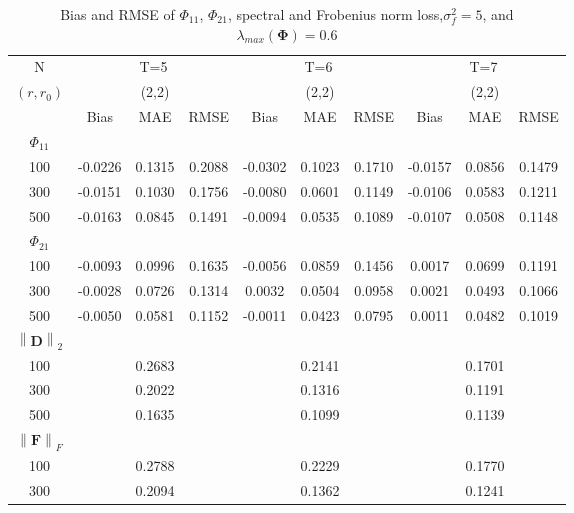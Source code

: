 \documentclass[12pt,a4paper,hyperref]{article}
\begin{document}
\begin{table}[H]
\caption{Bias and RMSE of $\Phi_{11}$, $\Phi_{21}$, spectral and Frobenius norm loss,$\sigma^{2}_{f}=5$,  and $\lambda_{max}(\boldsymbol{\Phi})=0.6$}
\centering
\tabcolsep=0.11cm
\begin{threeparttable}
\begin{tabular} {*{10}{c}}
\toprule
N& \multicolumn{3}{c}{T=5}&\multicolumn{3}{c}{T=6}&\multicolumn{3}{c}{T=7}\\
\cmidrule(lr){1-10}
$(r,r_{0})$ &   &(2,2)  &  &   &(2,2)  & &  &(2,2) & \\
\cmidrule(lr){1-4} \cmidrule(lr){5-7}\cmidrule(lr){8-10}
& \multicolumn{1}{c}{Bias} &\multicolumn{1}{c}{MAE}& \multicolumn{1}{c}{RMSE}&\multicolumn{1}{c}{Bias} &\multicolumn{1}{c}{MAE}& \multicolumn{1}{c}{RMSE}&\multicolumn{1}{c}{Bias}&\multicolumn{1}{c}{MAE} & \multicolumn{1}{c}{RMSE}\\
  \cmidrule(lr){2-4} \cmidrule(lr){5-7} \cmidrule(lr){8-10}
 $\Phi_{11}$\\
\cmidrule(lr){1-10}
 100& -0.0226&0.1315&0.2088& -0.0302& 0.1023&0.1710 &-0.0157 &0.0856 &0.1479\\
300& -0.0151& 0.1030& 0.1756&-0.0080  & 0.0601&0.1149 & -0.0106& 0.0583&0.1211\\
500&-0.0163& 0.0845&0.1491 & -0.0094 & 0.0535& 0.1089& -0.0107& 0.0508&0.1148 \\
\cmidrule(lr){1-10}
$\Phi_{21}$\\
\cmidrule(lr){1-4}   \cmidrule(lr){5-7}   \cmidrule(lr){8-10}
100&-0.0093 & 0.0996& 0.1635& -0.0056& 0.0859&0.1456& 0.0017& 0.0699&0.1191 \\
300& -0.0028& 0.0726& 0.1314& 0.0032 &0.0504 & 0.0958&0.0021 & 0.0493&0.1066\\
500&-0.0050 & 0.0581& 0.1152&-0.0011 &0.0423 & 0.0795& 0.0011&0.0482 & 0.1019\\
\cmidrule(lr){1-10}
$\left\| \boldsymbol{D} \right\|_{2} $\\
\cmidrule(lr){1-4}   \cmidrule(lr){5-7}   \cmidrule(lr){8-10}
100& &0.2683 & &  &0.2141 & & &0.1701& \\
300& &0.2022 & &  &0.1316 & & & 0.1191&\\
500& & 0.1635& &  & 0.1099& & & 0.1139& \\
\cmidrule(lr){1-10}
$\left\| \boldsymbol{F} \right\|_{F} $\\
\cmidrule(lr){1-4}   \cmidrule(lr){5-7}   \cmidrule(lr){8-10}
100& & 0.2788& &  &0.2229 & & & 0.1770& \\
300& &0.2094& &  & 0.1362& & &0.1241 &\\

\end{tabular}
\end{threeparttable}
\end{table}
\end{document}
